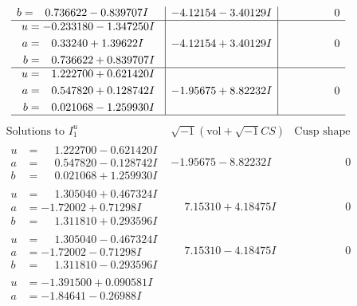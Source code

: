 \documentclass[1p]{elsarticle_modified}
\theoremstyle{definition}
\newcommand{\I}{\sqrt{-1}}
\begin{document}
$$\begin{array}{c|c|c}
\begin{aligned}
b &= \phantom{-}0.736622 - 0.839707 I\end{aligned}
 & -4.12154 - 3.40129 I & \phantom{-0.000000 } 0 \\ \hline\begin{aligned}
u &= -0.233180 - 1.347250 I \\
a &= \phantom{-}0.33240 + 1.39622 I \\
b &= \phantom{-}0.736622 + 0.839707 I\end{aligned}
 & -4.12154 + 3.40129 I & \phantom{-0.000000 } 0 \\ \hline\begin{aligned}
u &= \phantom{-}1.222700 + 0.621420 I \\
a &= \phantom{-}0.547820 + 0.128742 I \\
b &= \phantom{-}0.021068 - 1.259930 I\end{aligned}
 & -1.95675 + 8.82232 I & \phantom{-0.000000 } 0\\
 \hline 
 \end{array}$$\newpage$$\begin{array}{c|c|c}  
\text{Solutions to }I^u_{1}& \I (\text{vol} + \sqrt{-1}CS) & \text{Cusp shape}\\
 \hline 
\begin{aligned}
u &= \phantom{-}1.222700 - 0.621420 I \\
a &= \phantom{-}0.547820 - 0.128742 I \\
b &= \phantom{-}0.021068 + 1.259930 I\end{aligned}
 & -1.95675 - 8.82232 I & \phantom{-0.000000 } 0 \\ \hline\begin{aligned}
u &= \phantom{-}1.305040 + 0.467324 I \\
a &= -1.72002 + 0.71298 I \\
b &= \phantom{-}1.311810 + 0.293596 I\end{aligned}
 & \phantom{-}7.15310 + 4.18475 I & \phantom{-0.000000 } 0 \\ \hline\begin{aligned}
u &= \phantom{-}1.305040 - 0.467324 I \\
a &= -1.72002 - 0.71298 I \\
b &= \phantom{-}1.311810 - 0.293596 I\end{aligned}
 & \phantom{-}7.15310 - 4.18475 I & \phantom{-0.000000 } 0 \\ \hline\begin{aligned}
u &= -1.391500 + 0.090581 I \\
a &= -1.84641 - 0.26988 I \\

\end{aligned}
\end{array}$$
\end{document}
